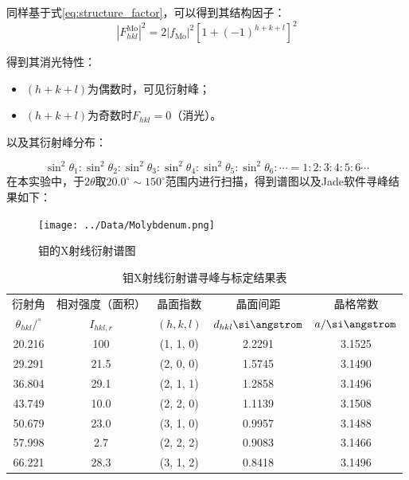 \documentclass{thuemp}
\begin{document}
同样基于式\ref{eq:structure_factor}，可以得到其结构因子：
\begin{equation}
    |F_{hkl}^{\text{Mo}}|^2 = 2|f_{\text{Mo}}|^2 \left[1+(-1)^{h+k+l}\right]^2
    \label{eq:mo_struct_fac}
\end{equation}

得到其消光特性：

\begin{itemize}
    \item $(h+k+l)$为偶数时，可见衍射峰；
    \item $(h+k+l)$为奇数时$F_{hkl}=0$（消光）。
\end{itemize}

以及其衍射峰分布：

\begin{equation}
    \sin^2\theta_1 : \sin^2\theta_2: \sin^2\theta_3 : \sin^2\theta_4 : \sin^2\theta_5 : \sin^2\theta_6 : \cdots =
    1 : 2 : 3 : 4 : 5 : 6 \cdots
    \label{eq:mo_diff_patt}
\end{equation}
在本实验中，于$2\theta$取$20.0^\circ \sim 150^\circ$范围内进行扫描，得到谱图以及Jade软件寻峰结果如下：

\begin{figure}[H]
    \centering
    \texttt{[image: ../Data/Molybdenum.png]}
    \caption{钼的X射线衍射谱图}
    \label{fig:mo_xrd}
\end{figure}

\begin{table}
    \centering
    \captionnamefont{\wuhao\bf\heiti}
    \captiontitlefont{\wuhao\bf\heiti}
    \caption{钼X射线衍射谱寻峰与标定结果表}
    \label{tab:mo_xrd}
    \liuhao
    \begin{tabular}{ccccc}
        \toprule
        衍射角 & 相对强度（面积）& 晶面指数 & 晶面间距 & 晶格常数 \\
        $\theta_{hkl}/^\circ$ & $I_{hkl,r}$ & $(h,k,l)$ & $d_{hkl}\text{\si\angstrom}$ & $a/\text{\si\angstrom}$\\
        \midrule
        20.216 &  100 & (1, 1, 0) & 2.2291 & 3.1525 \\
        29.291 & 21.5 & (2, 0, 0) & 1.5745 & 3.1490 \\
        36.804 & 29.1 & (2, 1, 1) & 1.2858 & 3.1496 \\
        43.749 & 10.0 & (2, 2, 0) & 1.1139 & 3.1508 \\
        50.679 & 23.0 & (3, 1, 0) & 0.9957 & 3.1488 \\
        57.998 &  2.7 & (2, 2, 2) & 0.9083 & 3.1466 \\
        66.221 & 28.3 & (3, 1, 2) & 0.8418 & 3.1496 \\
        \bottomrule
    \end{tabular}
\end{table}
\end{document}
